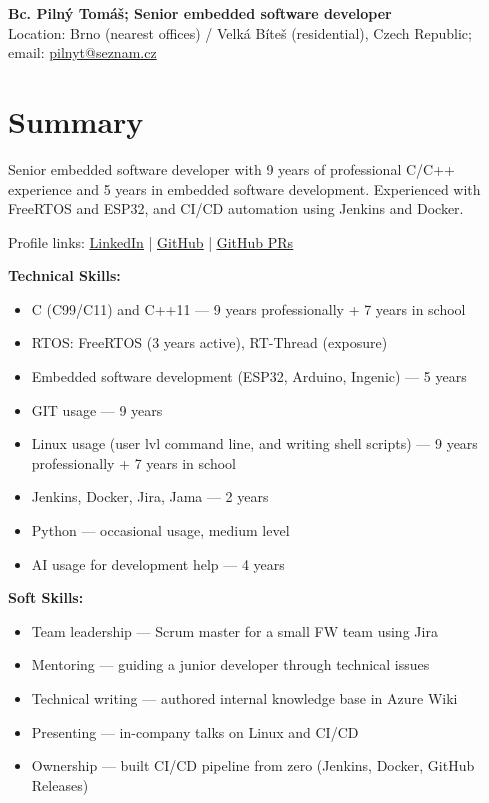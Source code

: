 \documentclass[10pt,a4paper]{article}
\let\plainhref\href
\renewcommand{\href}[2]{\plainhref{#1}{\underline{#2}}}
\newcommand{\githubsearch}[2]{\href{#1}{#2}}
\begin{document}
\begin{center}
  {\LARGE\bfseries Bc. Pilný Tomáš; Senior embedded software developer}\\[3pt]
  {\fontsize{8}{10}\selectfont Location: Brno (nearest offices) / Velká Bíteš (residential), Czech Republic;
  email: \plainhref{mailto:pilnyt@seznam.cz}{pilnyt@seznam.cz}}
\end{center}
\section{Summary}
Senior embedded software developer with 9 years of professional C/C++ experience and 5 years in embedded software development. Experienced with FreeRTOS and ESP32, and CI/CD automation using Jenkins and Docker.

\noindent
\begin{minipage}[t]{0.72\textwidth}
  \vspace{0pt}
  Profile links:
  \href{https://www.linkedin.com/in/tom\%C3\%A1\%C5\%A1-piln\%C3\%BD-69454bb8/}{LinkedIn}
  \;|\; \href{https://github.com/PilnyTomas}{GitHub}
  \;|\; \githubsearch{https://github.com/search?q=author\%3APilnyTomas+is\%3Apr+is\%3Amerged\&type=pullrequests}{GitHub PRs}\par\addvspace{8pt}
  {\large\bfseries Technical Skills:}
  \begin{itemize}
    \item C (C99/C11) and C++11 — 9 years professionally + 7 years in school
    \item RTOS: FreeRTOS (3 years active), RT-Thread (exposure)
    \item Embedded software development (ESP32, Arduino, Ingenic) — 5 years
    \item GIT usage — 9 years
    \item Linux usage (user lvl command line, and writing shell scripts) — 9 years professionally + 7 years in school
    \item Jenkins, Docker, Jira, Jama — 2 years
    \item Python — occasional usage, medium level
    \item AI usage for development help — 4 years
  \end{itemize}

  {\large\bfseries Soft Skills:}
  \begin{itemize}
  \item Team leadership — Scrum master for a small FW team using Jira
    \item Mentoring — guiding a junior developer through technical issues
    \item Technical writing — authored internal knowledge base in Azure Wiki
    \item Presenting — in-company talks on Linux and CI/CD
    \item Ownership — built CI/CD pipeline from zero (Jenkins, Docker, GitHub Releases)
  \end{itemize}
\end{minipage}\hfill
\end{document}
